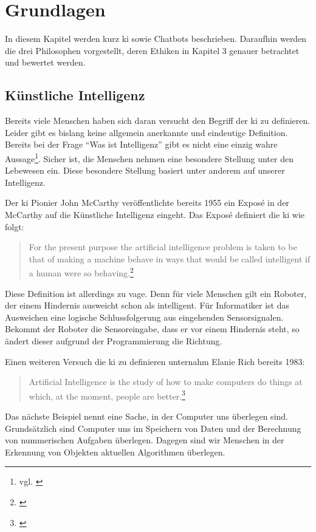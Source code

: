 \section{Grundlagen}
In diesem Kapitel werden kurz \ac{ki} sowie Chatbots beschrieben.
Daraufhin werden die drei Philosophen vorgestellt, deren Ethiken in Kapitel 3 genauer betrachtet und bewertet werden.

\subsection{Künstliche Intelligenz}
Bereits viele Menschen haben sich daran versucht den Begriff der \ac{ki} zu definieren. Leider gibt es bislang keine allgemein anerkannte und eindeutige Definition. Bereits bei der Frage \enquote{Was ist Intelligenz} gibt es nicht eine einzig wahre Aussage\footnote{vgl. \cite{Intelligenz}}. Sicher ist, die Menschen nehmen eine besondere Stellung unter den Lebewesen ein. Diese besondere Stellung basiert unter anderem auf unserer Intelligenz. 

Der \ac{ki} Pionier John McCarthy veröffentlichte bereits 1955 ein Exposé in der McCarthy auf die Künstliche Intelligenz eingeht. Das Exposé definiert die \ac{ki} wie folgt:
\begin{quote}
		\glqq For the present purpose the artificial intelligence problem is taken to be that of making a machine behave in ways that would be called intelligent if a human were so behaving\grqq.\footnote{\cite{PROPOSALMcCarthy}}
\end{quote}
Diese Definition ist allerdings zu vage. Denn für viele Menschen gilt ein Roboter, der einem Hindernis ausweicht schon als intelligent. Für Informatiker ist das Ausweichen eine logische Schlussfolgerung aus eingehenden Sensorsignalen. Bekommt der Roboter die Sensoreingabe, dass er vor einem Hindernis steht, so ändert dieser aufgrund der Programmierung die Richtung.

Einen weiteren Versuch die \ac{ki} zu definieren unternahm Elanie Rich bereits 1983:
\begin{quote}
	 \glqq Artificial Intelligence is the study of how to make computers do things at which, at the moment, people are better\grqq.\footnote{\cite{ArtificialIntelligence}}
\end{quote}

Das nächste Beispiel nennt eine \glqq Sache\grqq , in der Computer uns überlegen sind. 
Grundsätzlich sind Computer uns im Speichern von Daten und der Berechnung von nummerischen Aufgaben überlegen. 
Dagegen sind wir Menschen in der Erkennung von Objekten aktuellen Algorithmen überlegen. 

